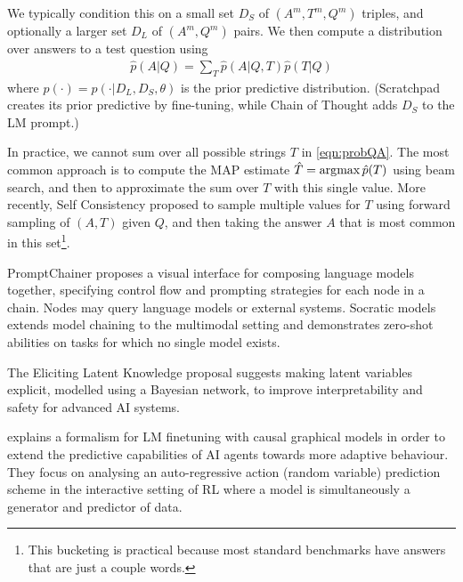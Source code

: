 We typically condition this on a small set
$D_S$ of  $(A^m,T^m,Q^m)$ triples,
and optionally a larger set $D_L$ of $(A^m, Q^m)$ pairs.
We then compute a distribution over answers to a test question
using
\begin{align}
\hat{p}(A|Q) = \sum_T 
\hat{p}(A|Q, T) \hat{p}(T|Q)
\label{eqn:probQA}
\end{align}
where $\hat{p}(\cdot) = p(\cdot|D_L,D_S,\theta)$
is the prior predictive distribution. (Scratchpad creates its prior predictive by fine-tuning, while Chain of Thought adds $D_S$ to the LM prompt.)

In practice, we cannot sum over all possible strings $T$
in \cref{eqn:probQA}.
The most common approach is to compute the MAP estimate
$\hat{T} = \operatorname*{\arg\!\max} \hat{p}(T)$ using beam search,
and then to approximate the sum over $T$ with this single
value.
More recently, Self Consistency \citep{selfconsistency} 
proposed to sample multiple values for $T$
using forward sampling of $(A,T)$ given $Q$,
and then taking the answer $A$ that is most common
in this set\footnote{This bucketing is practical because most standard benchmarks have answers that are just a couple words.}.

PromptChainer \citep{promptchainer} proposes a visual interface for composing language models together, specifying control flow and prompting strategies for each node in a chain. Nodes may query language models or external systems. 
Socratic models \citep{socraticmodels} extends model chaining to the multimodal setting and demonstrates zero-shot abilities on tasks for which no single model exists.

The Eliciting Latent Knowledge proposal \citep{ELK} suggests making latent variables explicit, modelled using a Bayesian network, to improve interpretability and safety for advanced AI systems.

\citet{ortega2021shaking} explains a formalism for LM finetuning with causal graphical models in order to extend the predictive capabilities of AI agents towards more adaptive behaviour. They focus on analysing an auto-regressive action (random variable) prediction scheme in the interactive setting of RL where a model is simultaneously a generator and predictor of data.


